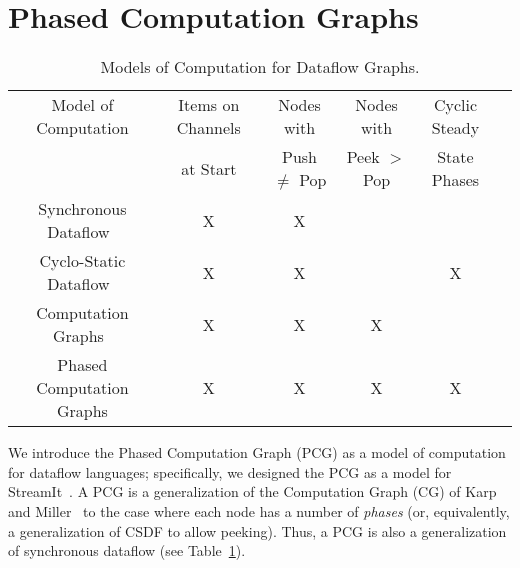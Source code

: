 \section{Phased Computation Graphs}
\label{sec:pcg}

\begin{table}[t]
\small
\begin{center}
\begin{tabular}{|c|c|c|c|c|c|} \hline
Model of Computation & Items on Channels & Nodes with & Nodes with & Cyclic Steady \\
                     & at Start & Push $\ne$ Pop & Peek $>$ Pop & State Phases \\
\hline \hline
Synchronous Dataflow~\cite{LM87-i} & X & X & & \\
\hline
Cyclo-Static Dataflow~\cite{BELP96} & X & X & & X \\
\hline
Computation Graphs~\cite{KM66} & X & X & X & \\
\hline
Phased Computation Graphs & X & X & X & X \\
\hline
\end{tabular}
\vspace{-6pt}
\caption{\protect\small Models of Computation for Dataflow Graphs.}
\label{tab:models}
\vspace{-12pt}
\end{center}
\end{table}

We introduce the Phased Computation Graph (PCG) as a model of
computation for dataflow languages; specifically, we designed the PCG
as a model for StreamIt~\cite{streamitcc}.  A PCG is a generalization
of the Computation Graph (CG) of Karp and Miller~\cite{KM66} to the
case where each node has a number of {\it phases} (or, equivalently, a
generalization of CSDF to allow peeking).  Thus, a PCG is also a
generalization of synchronous dataflow (see Table~\ref{tab:models}).

